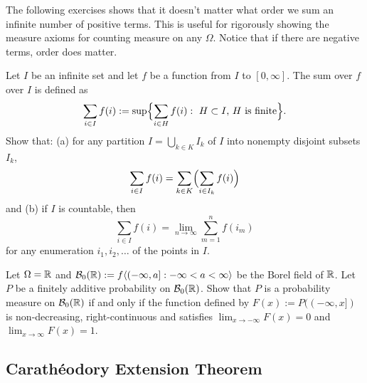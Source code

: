 The following exercises shows that it doesn't matter what order we sum an infinite number of positive terms. This is useful for rigorously showing the measure axioms for counting measure on any $\Omega$. Notice that if there are negative terms, order does matter.
\begin{exercise}
Let $I$ be an infinite set and let $f$ be a function from $I$ to $[0,\infty]$. The sum over $f$ over $I$ is defined as
\[ \sum_{i\in I} f(i):=\sup\Bigl\{ \sum_{i\in H} f(i): \text{ $H\subset I$, $H$ is finite}  \Bigr\}. \]
Show that: (a) for any partition $I = \bigcup_{k\in K} I_k$ of $I$ into nonempty disjoint subsets $I_k$,
\[  \sum_{i\in I} f(i) =  \sum_{k\in K}\Bigl(\sum_{i\in I_k} f(i)\Bigr) \]
and (b) if $I$ is countable, then
\[  \sum_{i\in I} f(i) = \lim_{n\rightarrow \infty} \sum_{m=1}^n f(i_m) \]
for any enumeration $i_1,i_2,\ldots$ of the points in $I$.
\end{exercise}





\begin{exercise}
Let $\Omega = \Bbb R$ and $\mathcal B_0(\Bbb R):= f\langle (-\infty,a]: -\infty < a <\infty  \rangle$ be the Borel field of $\Bbb R$. Let $P$ be a finitely additive probability on $\mathcal B_0(\Bbb R)$. Show that $P$ is a probability measure on  $\mathcal B_0(\Bbb R)$ if and only if the function defined by $F(x):= P((-\infty, x])$ is non-decreasing, right-continuous and satisfies $\lim_{x\rightarrow -\infty} F(x)=0$ and  $\lim_{x\rightarrow \infty} F(x)=1$.
\end{exercise}
%


\subsection{Carath\'eodory Extension Theorem}


